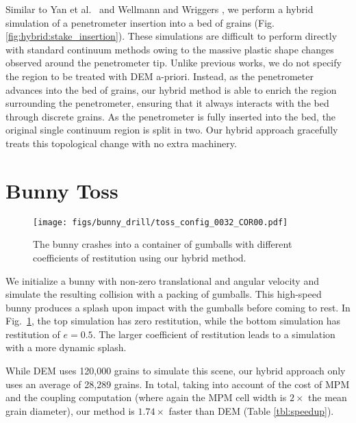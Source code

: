 
Similar to Yan et al.~\cite{Yan:2010} and Wellmann and Wriggers \cite{Wellmann:2012}, we perform a hybrid
simulation of a penetrometer insertion into a bed of grains (Fig. \ref{fig:hybrid:stake_insertion}). These simulations
are difficult to perform directly with standard continuum methods owing to the massive plastic shape changes observed
around the penetrometer tip. Unlike previous works, we do not specify the region to be treated with DEM
a-priori. Instead, as the penetrometer advances into the bed of grains, our hybrid method is able to
enrich the region surrounding the penetrometer, ensuring that it always interacts with the bed through discrete grains.
As the penetrometer is fully inserted into the bed, the original single continuum region is split in two. Our hybrid
approach gracefully treats this topological change with no extra machinery.

\section{Bunny Toss}
\begin{figure}
  \centering
  \texttt{[image: figs/bunny\_drill/toss\_config\_0032\_COR00.pdf]}
  \caption{The bunny crashes into a container of gumballs with different coefficients of restitution using our hybrid method.}
  \label{fig:hybrid:bunny_toss}
\end{figure}
We initialize a bunny with non-zero translational and angular velocity and simulate the resulting collision 
with a packing of gumballs. This high-speed bunny produces a splash upon impact with the gumballs before coming to rest.
In Fig.~\ref{fig:hybrid:bunny_toss}, the top simulation has zero restitution, while the bottom simulation has restitution of $e = 0.5$.
The larger coefficient of restitution leads to a simulation with a more dynamic splash.

While DEM uses 120,000 grains to simulate this scene, our hybrid approach only uses an average of 28,289 grains. In total, taking into account of the cost of MPM and the coupling computation (where again the MPM cell width is $2\times$ the mean grain diameter), our method is $1.74\times$ faster than DEM (Table \ref{tbl:speedup}).

